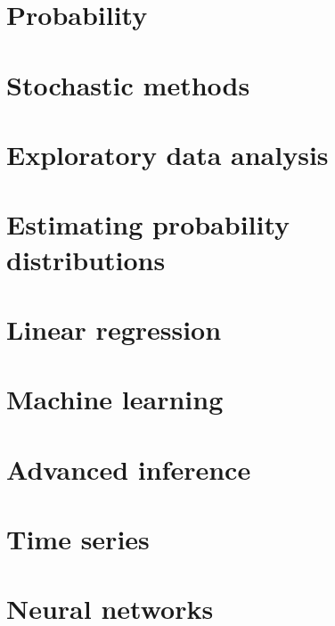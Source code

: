 \part{Probability}







\part{Stochastic methods}




\part{Exploratory data analysis}








\part{Estimating probability distributions}








\part{Linear regression}







\part{Machine learning}







\part{Advanced inference}






\part{Time series}





\part{Neural networks}





